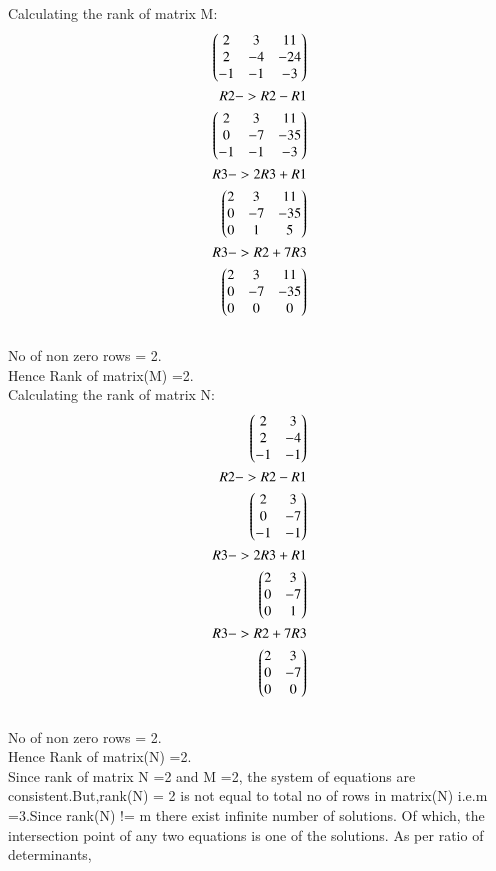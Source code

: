\documentclass[journal,12pt,twocolumn]{IEEEtran}
\begin{document}
Calculating the rank of matrix M:
\begin{align*}
\begin{pmatrix}2 & 3 & 11\\2 & -4 & -24\\-1 & -1 & -3\end{pmatrix}
\\R2 -> R2-R1\\
\begin{pmatrix}2 & 3 & 11\\0 & -7 & -35\\-1 & -1 & -3\end{pmatrix}
\\R3 -> 2R3+R1\\
\begin{pmatrix}2 & 3 & 11\\0 & -7 & -35\\0 & 1 & 5\end{pmatrix}
\\R3 -> R2+7R3\\
\begin{pmatrix}2 & 3 & 11\\0 & -7 & -35\\0 & 0 & 0\end{pmatrix}
\end{align*}
\\No of non zero rows = 2.
\\Hence Rank of matrix(M) =2.
\\Calculating the rank of matrix N:
\begin{align*}
\begin{pmatrix}2 & 3\\2 & -4\\-1 & -1\end{pmatrix}
\\R2 -> R2-R1\\
\begin{pmatrix}2 & 3\\0 & -7\\-1 & -1\end{pmatrix}
\\R3 -> 2R3+R1\\
\begin{pmatrix}2 & 3\\0 & -7\\0 & 1\end{pmatrix}
\\R3 -> R2+7R3\\
\begin{pmatrix}2 & 3\\0 & -7\\0 & 0\end{pmatrix}
\end{align*}
\\No of non zero rows = 2.
\\Hence Rank of matrix(N) =2.\\
Since rank of matrix N =2 and M =2, the system of equations are consistent.But,rank(N) = 2 is not equal to total no of rows in matrix(N) i.e.m =3.Since rank(N) != m there exist infinite number of solutions. Of which, the intersection point of any two equations is one of the solutions.
As per ratio of determinants,\\
\end{document}
